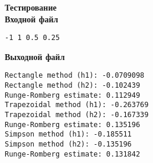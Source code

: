\textbf{Тестирование}\\

\textbf{Входной файл}
\begin{verbatim}
-1 1 0.5 0.25
\end{verbatim}

\textbf{Выходной файл}
\begin{verbatim}
Rectangle method (h1): -0.0709098
Rectangle method (h2): -0.102439
Runge-Romberg estimate: 0.112949
Trapezoidal method (h1): -0.263769
Trapezoidal method (h2): -0.167339
Runge-Romberg estimate: 0.135196
Simpson method (h1): -0.185511
Simpson method (h2): -0.135196
Runge-Romberg estimate: 0.131842
\end{verbatim}

\pagebreak
